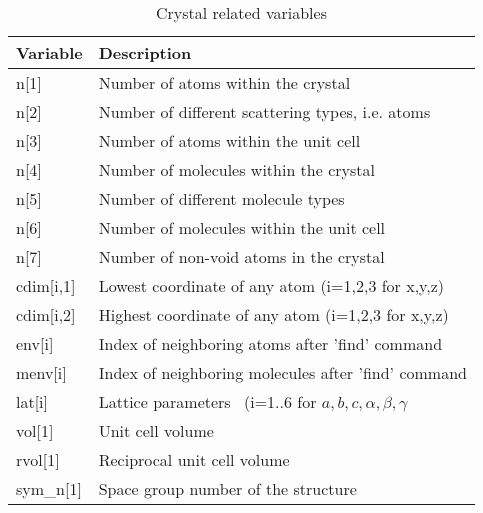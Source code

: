 \begin{table}[!tbh]
\centering
\begin{tabularx}{\textwidth}{|p{30mm}|X|}
  \hline
  {\bf Variable} & {\bf Description} \\
  \hline\hline
  n[1]      & Number of atoms within the crystal \\
  n[2]      & Number of different scattering types, i.e. atoms \\
  n[3]      & Number of atoms within the unit cell \\
  n[4]      & Number of molecules within the crystal \\
  n[5]      & Number of different molecule types \\
  n[6]      & Number of molecules within the unit cell \\
  n[7]      & Number of non-void atoms in the crystal \\
  \hline
  cdim[i,1] & Lowest coordinate of any atom (i=1,2,3 for x,y,z) \\
  cdim[i,2] & Highest coordinate of any atom (i=1,2,3 for x,y,z) \\
  \hline\hline
  env[i]    & Index of neighboring atoms after 'find' command \\
  menv[i]   & Index of neighboring molecules after 'find' command \\
  \hline\hline
  lat[i]    & Lattice parameters \
              (i=1..6 for $a,b,c,\alpha,\beta,\gamma$\\
  vol[1]    & Unit cell volume \\
  rvol[1]   & Reciprocal unit cell volume \\
  \hline
  sym\_n[1] & Space group number of the structure\\
  \hline
\end{tabularx}
\caption{\label{v1-tab}Crystal related variables}
\end{table}

